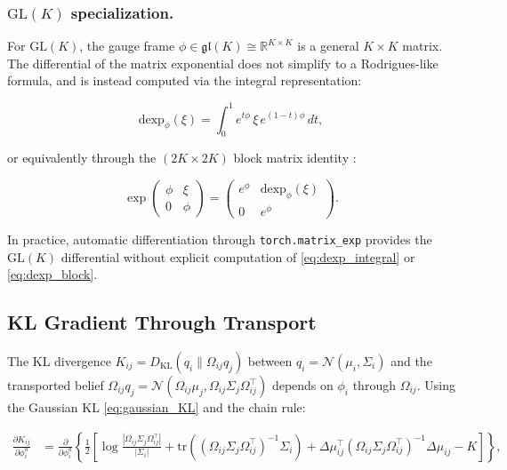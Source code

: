 \documentclass[twoside,11pt]{article}
\begin{document}
\subsubsection{$\mathrm{GL}(K)$ specialization.}

For $\mathrm{GL}(K)$, the gauge frame $\phi \in \mathfrak{gl}(K) \cong \mathbb{R}^{K \times K}$ is a general $K \times K$ matrix. The differential of the matrix exponential does not simplify to a Rodrigues-like formula, and is instead computed via the integral representation:

\begin{equation}
\mathrm{dexp}_\phi(\xi) = \int_0^1 e^{t\phi} \, \xi \, e^{(1-t)\phi} \, dt,
\label{eq:dexp_integral}
\end{equation}

or equivalently through the $(2K \times 2K)$ block matrix identity \citep{higham2008functions}:

\begin{equation}
\exp\!\begin{pmatrix} \phi & \xi \\ 0 & \phi \end{pmatrix}
= \begin{pmatrix} e^\phi & \mathrm{dexp}_\phi(\xi) \\ 0 & e^\phi \end{pmatrix}.
\label{eq:dexp_block}
\end{equation}

In practice, automatic differentiation through \texttt{torch.matrix\_exp} provides the $\mathrm{GL}(K)$ differential without explicit computation of \eqref{eq:dexp_integral} or \eqref{eq:dexp_block}.

\subsection{KL Gradient Through Transport}

The KL divergence $K_{ij} = D_{\mathrm{KL}}(q_i \| \Omega_{ij} q_j)$ between $q_i = \mathcal{N}(\mu_i, \Sigma_i)$ and the transported belief $\Omega_{ij} q_j = \mathcal{N}(\Omega_{ij}\mu_j, \Omega_{ij}\Sigma_j\Omega_{ij}^\top)$ depends on $\phi_i$ through $\Omega_{ij}$. Using the Gaussian KL \eqref{eq:gaussian_KL} and the chain rule:

\begin{align}
\frac{\partial K_{ij}}{\partial \phi_i^a}
&= \frac{\partial}{\partial \phi_i^a}\left\{
\frac{1}{2}\left[
\log\frac{|\Omega_{ij}\Sigma_j\Omega_{ij}^\top|}{|\Sigma_i|}
+ \mathrm{tr}\!\left((\Omega_{ij}\Sigma_j\Omega_{ij}^\top)^{-1}\Sigma_i\right)
+ \Delta\mu_{ij}^\top (\Omega_{ij}\Sigma_j\Omega_{ij}^\top)^{-1} \Delta\mu_{ij}
- K
\right]\right\},
\label{eq:dKL_dphi_expanded}
\end{align}
\end{document}
